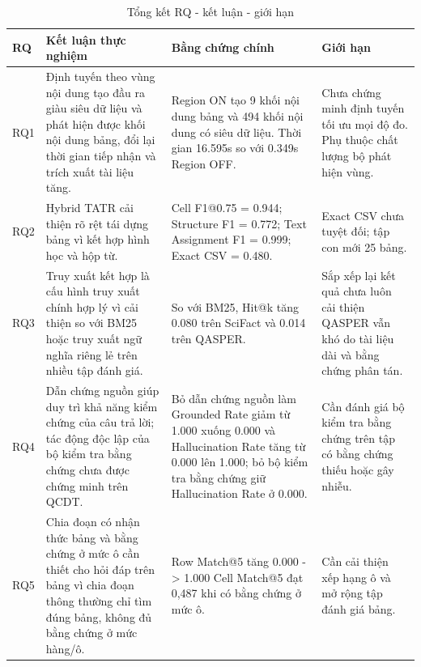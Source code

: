 \documentclass[../DoAn.tex]{subfiles}
\begin{document}
\begin{table}[H]
\centering
\caption{Tổng kết RQ - kết luận - giới hạn}
\label{tab:rq-summary-chapter6}

\footnotesize
\begin{tabularx}{\textwidth}{|
>{\raggedright\arraybackslash}p{}|
>{\raggedright\arraybackslash}X|
>{\raggedright\arraybackslash}p{}|
>{\raggedright\arraybackslash}p{}|
}
\hline
\textbf{RQ} & \textbf{Kết luận thực nghiệm} & \textbf{Bằng chứng chính} & \textbf{Giới hạn} \\
\hline
RQ1 & Định tuyến theo vùng nội dung tạo đầu ra giàu siêu dữ liệu và phát hiện được khối nội dung bảng, đổi lại thời gian tiếp nhận và trích xuất tài liệu tăng. & Region ON tạo 9 khối nội dung bảng và 494 khối nội dung có siêu dữ liệu. \newline Thời gian 16.595s so với 0.349s Region OFF. & Chưa chứng minh định tuyến tối ưu mọi độ đo. \newline Phụ thuộc chất lượng bộ phát hiện vùng. \\
\hline
RQ2 & Hybrid TATR cải thiện rõ rệt tái dựng bảng vì kết hợp hình học và hộp từ. & Cell F1@0.75 = 0.944; Structure F1 = 0.772; Text Assignment F1 = 0.999; Exact CSV = 0.480. & Exact CSV chưa tuyệt đối; tập con mới 25 bảng. \\
\hline
RQ3 & Truy xuất kết hợp là cấu hình truy xuất chính hợp lý vì cải thiện so với BM25 hoặc truy xuất ngữ nghĩa riêng lẻ trên nhiều tập đánh giá.
& So với BM25, Hit@k tăng 0.080 trên SciFact  và 0.014 trên QASPER.
& Sắp xếp lại kết quả chưa luôn cải thiện \newline QASPER vẫn khó do tài liệu dài và bằng chứng phân tán. \\
\hline
RQ4 & Dẫn chứng nguồn giúp duy trì khả năng kiểm chứng của câu trả lời; tác động độc lập của bộ kiểm tra bằng chứng chưa được chứng minh trên QCDT. & Bỏ dẫn chứng nguồn làm Grounded Rate giảm từ 1.000 xuống 0.000 và Hallucination Rate tăng từ 0.000 lên 1.000; bỏ bộ kiểm tra bằng chứng giữ Hallucination Rate ở 0.000. & Cần đánh giá bộ kiểm tra bằng chứng trên tập có bằng chứng thiếu hoặc gây nhiễu. \\
\hline
RQ5 & Chia đoạn có nhận thức bảng và bằng chứng ở mức ô cần thiết cho hỏi đáp trên bảng vì chia đoạn thông thường chỉ tìm đúng bảng, không đủ bằng chứng ở mức hàng/ô. & Row Match@5 tăng 0.000 -> 1.000 \newline Cell Match@5 đạt 0,487 khi có bằng chứng ở mức ô. & Cần cải thiện xếp hạng ô và mở rộng tập đánh giá bảng. \\
\hline
\end{tabularx}
\end{table}
\end{document}
